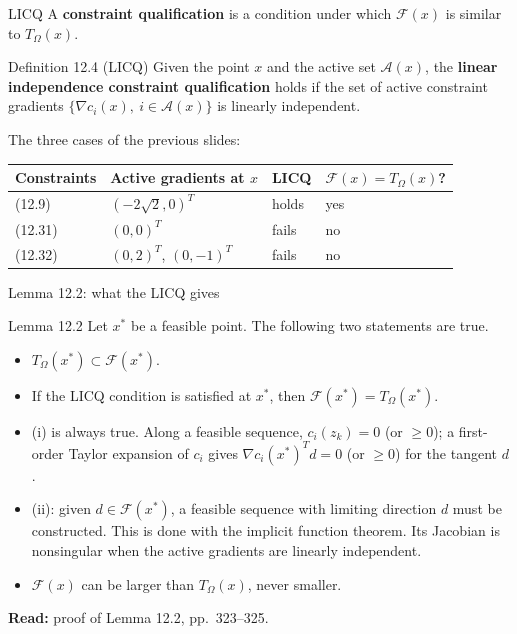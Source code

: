 \documentclass[aspectratio=169,12pt]{beamer}
\newcommand{\xs}{x^{*}}
\newcommand{\readbook}[1]{{\color{red}\textbf{Read:} #1}}
\newcommand{\cA}{\mathcal{A}}
\newcommand{\cF}{\mathcal{F}}
\newcommand{\TO}{T_{\Omega}}
\begin{document}
\begin{frame}{LICQ}
  A \textbf{constraint qualification} is a condition under which $\cF(x)$ is similar to $\TO(x)$.
  \begin{block}{Definition 12.4 (LICQ)}
    Given the point $x$ and the active set $\cA(x)$, the \textbf{linear independence constraint
    qualification} holds if the set of active constraint gradients
    $\{\nabla c_{i}(x),\ i\in\cA(x)\}$ is linearly independent.
  \end{block}
  \vspace{0.2em}
  The three cases of the previous slides:
  \begin{center}\small\setlength\tabcolsep{8pt}
  \begin{tabular}{llll}
    \toprule
    Constraints & Active gradients at $x$ & LICQ & $\cF(x)=\TO(x)$? \\
    \midrule
    (12.9) & $(-2\sqrt2,0)^{T}$ & holds & yes \\
    (12.31) & $(0,0)^{T}$ & fails & no \\
    (12.32) & $(0,2)^{T}$, $(0,-1)^{T}$ & fails & no \\
    \bottomrule
  \end{tabular}
  \end{center}
\end{frame}

\begin{frame}{Lemma 12.2: what the LICQ gives}
  \begin{block}{Lemma 12.2}
    Let $\xs$ be a feasible point. The following two statements are true.
    \begin{itemize}
      \item[(i)] $\TO(\xs)\subset\cF(\xs)$.
      \item[(ii)] If the LICQ condition is satisfied at $\xs$, then $\cF(\xs)=\TO(\xs)$.
    \end{itemize}
  \end{block}
  \begin{itemize}\setlength\itemsep{0.35em}
    \item (i) is always true. Along a feasible sequence, $c_{i}(z_{k})=0$ (or $\ge 0$); a first-order
      Taylor expansion of $c_{i}$ gives $\nabla c_{i}(\xs)^{T}d=0$ (or $\ge 0$) for the tangent $d$.
    \item (ii): given $d\in\cF(\xs)$, a feasible sequence with limiting direction $d$ must be
      constructed. This is done with the implicit function theorem. Its Jacobian is nonsingular
      when the active gradients are linearly independent.
    \item $\cF(x)$ can be larger than $\TO(x)$, never smaller.
  \end{itemize}
  \readbook{proof of Lemma 12.2, pp.~323--325.}
\end{frame}
\end{document}
